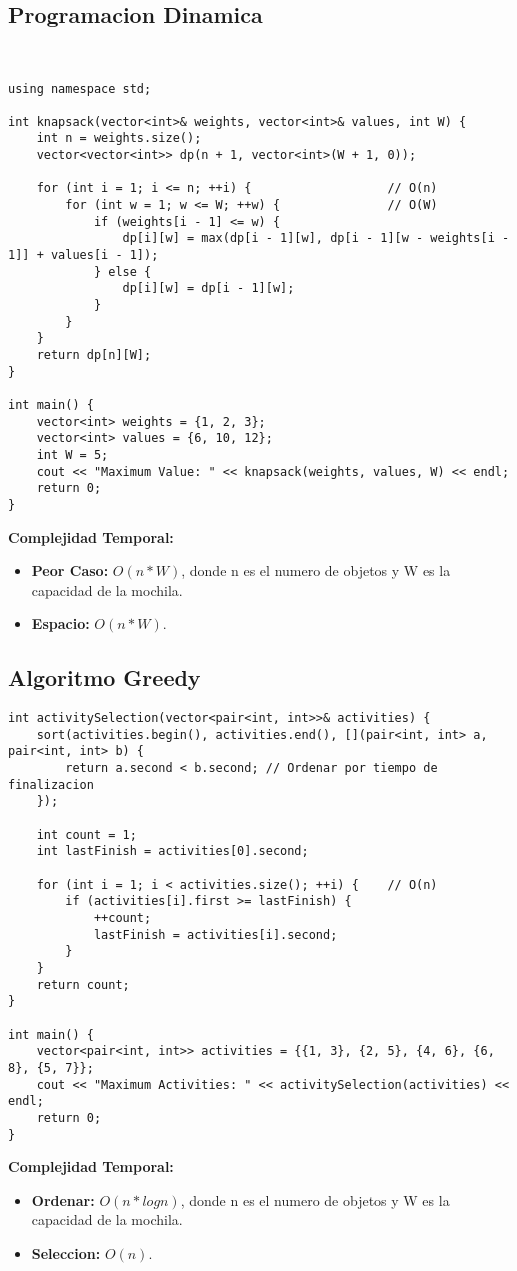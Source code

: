 \subsection{Programacion Dinamica}
    \begin{lstlisting}[style=cpp]
   

using namespace std;

int knapsack(vector<int>& weights, vector<int>& values, int W) {
    int n = weights.size();
    vector<vector<int>> dp(n + 1, vector<int>(W + 1, 0));

    for (int i = 1; i <= n; ++i) {                   // O(n)
        for (int w = 1; w <= W; ++w) {               // O(W)
            if (weights[i - 1] <= w) {
                dp[i][w] = max(dp[i - 1][w], dp[i - 1][w - weights[i - 1]] + values[i - 1]);
            } else {
                dp[i][w] = dp[i - 1][w];
            }
        }
    }
    return dp[n][W];
}

int main() {
    vector<int> weights = {1, 2, 3};
    vector<int> values = {6, 10, 12};
    int W = 5;
    cout << "Maximum Value: " << knapsack(weights, values, W) << endl;
    return 0;
}

    \end{lstlisting}
    \textbf{Complejidad Temporal: }
    \begin{itemize}
        \item \textbf{Peor Caso: }$O(n *W)$, donde n es el numero de objetos y W es la capacidad de la mochila.
        \item \textbf{Espacio: }$O(n*W).$
    \end{itemize}

\subsection{Algoritmo Greedy}
    \begin{lstlisting}[style=cpp]
int activitySelection(vector<pair<int, int>>& activities) {
    sort(activities.begin(), activities.end(), [](pair<int, int> a, pair<int, int> b) {
        return a.second < b.second; // Ordenar por tiempo de finalizacion
    });

    int count = 1;
    int lastFinish = activities[0].second;

    for (int i = 1; i < activities.size(); ++i) {    // O(n)
        if (activities[i].first >= lastFinish) {
            ++count;
            lastFinish = activities[i].second;
        }
    }
    return count;
}

int main() {
    vector<pair<int, int>> activities = {{1, 3}, {2, 5}, {4, 6}, {6, 8}, {5, 7}};
    cout << "Maximum Activities: " << activitySelection(activities) << endl;
    return 0;
}
    \end{lstlisting}
    \textbf{Complejidad Temporal: }
    \begin{itemize}
        \item \textbf{Ordenar: }$O(n*logn)$, donde n es el numero de objetos y W es la capacidad de la mochila.
        \item \textbf{Seleccion: }$O(n).$
    \end{itemize}



